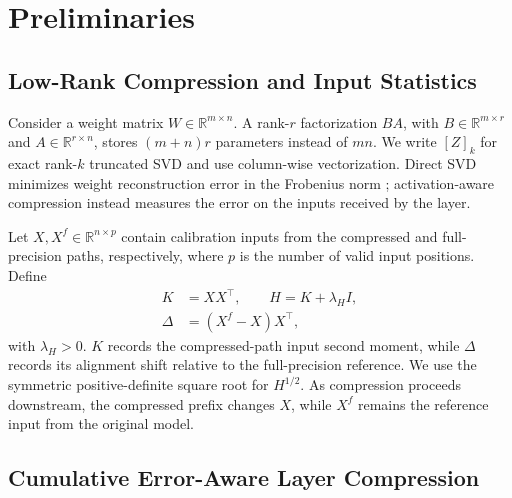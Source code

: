\documentclass[11pt]{article}
\begin{document}
\section{Preliminaries}\label{sec:preliminaries}

\subsection{Low-Rank Compression and Input Statistics}

Consider a weight matrix $W\in\mathbb R^{m\times n}$. A rank-$r$ factorization $BA$, with $B\in\mathbb R^{m\times r}$ and $A\in\mathbb R^{r\times n}$, stores $(m+n)r$ parameters instead of $mn$. We write $[Z]_k$ for exact rank-$k$ truncated SVD and use column-wise vectorization. Direct SVD minimizes weight reconstruction error in the Frobenius norm \citep{eckart1936eym}; activation-aware compression instead measures the error on the inputs received by the layer.

Let $X,X^f\in\mathbb R^{n\times p}$ contain calibration inputs from the compressed and full-precision paths, respectively, where $p$ is the number of valid input positions. Define
\begin{equation}
\begin{aligned}
K&=XX^\top,\qquad H=K+\lambda_H I,\\
\Delta&=(X^f-X)X^\top,
\end{aligned}
\label{eq:input-statistics}
\end{equation}
with $\lambda_H>0$. $K$ records the compressed-path input second moment, while $\Delta$ records its alignment shift relative to the full-precision reference. We use the symmetric positive-definite square root for $H^{1/2}$. As compression proceeds downstream, the compressed prefix changes $X$, while $X^f$ remains the reference input from the original model.

\subsection{Cumulative Error-Aware Layer Compression}\label{sec:cealc}
\end{document}
